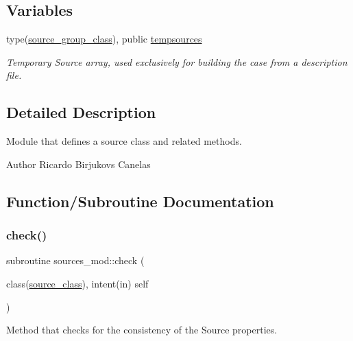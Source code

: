 \subsection*{Variables}
\begin{DoxyCompactItemize}
\item 
type(\mbox{\hyperlink{structsources__mod_1_1source__group__class}{source\+\_\+group\+\_\+class}}), public \mbox{\hyperlink{namespacesources__mod_ab04ea8c02cdf83a1a356c8710ae811d5}{tempsources}}
\begin{DoxyCompactList}\small\item\em Temporary Source array, used exclusively for building the case from a description file. \end{DoxyCompactList}\end{DoxyCompactItemize}


\subsection{Detailed Description}
Module that defines a source class and related methods. 

\begin{DoxyAuthor}{Author}
Ricardo Birjukovs Canelas 
\end{DoxyAuthor}


\subsection{Function/\+Subroutine Documentation}
\mbox{\label{namespacesources__mod_a6fcfcb690cd1b9375915b01f7ddbe801}} 
\subsubsection{\texorpdfstring{check()}{check()}}
{\footnotesize\ttfamily subroutine sources\+\_\+mod\+::check (\begin{DoxyParamCaption}\item[{class(\mbox{\hyperlink{structsources__mod_1_1source__class}{source\+\_\+class}}), intent(in)}]{self }\end{DoxyParamCaption})\hspace{0.3cm}{\ttfamily [private]}}



Method that checks for the consistency of the Source properties. 


